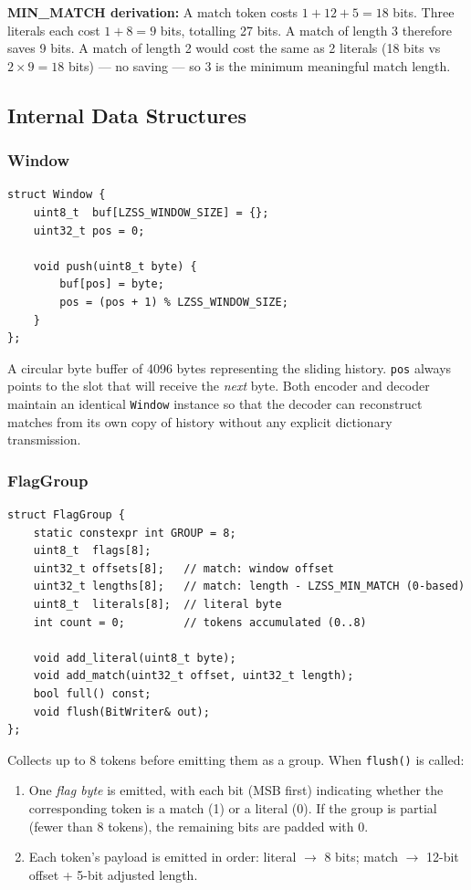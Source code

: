 \textbf{MIN\_MATCH derivation:}
A match token costs $1 + 12 + 5 = 18$ bits.
Three literals each cost $1 + 8 = 9$ bits, totalling 27 bits.
A match of length 3 therefore saves 9 bits.
A match of length 2 would cost the same as 2 literals (18 bits vs $2 \times 9 = 18$ bits)
--- no saving --- so 3 is the minimum meaningful match length.

\subsection{Internal Data Structures}

\subsubsection{Window}

\begin{lstlisting}[style=cpp]
struct Window {
    uint8_t  buf[LZSS_WINDOW_SIZE] = {};
    uint32_t pos = 0;

    void push(uint8_t byte) {
        buf[pos] = byte;
        pos = (pos + 1) % LZSS_WINDOW_SIZE;
    }
};
\end{lstlisting}

A circular byte buffer of 4096 bytes representing the sliding history.
\texttt{pos} always points to the slot that will receive the \emph{next} byte.
Both encoder and decoder maintain an identical \texttt{Window} instance so that
the decoder can reconstruct matches from its own copy of history without any
explicit dictionary transmission.

\subsubsection{FlagGroup}

\begin{lstlisting}[style=cpp]
struct FlagGroup {
    static constexpr int GROUP = 8;
    uint8_t  flags[8];
    uint32_t offsets[8];   // match: window offset
    uint32_t lengths[8];   // match: length - LZSS_MIN_MATCH (0-based)
    uint8_t  literals[8];  // literal byte
    int count = 0;         // tokens accumulated (0..8)

    void add_literal(uint8_t byte);
    void add_match(uint32_t offset, uint32_t length);
    bool full() const;
    void flush(BitWriter& out);
};
\end{lstlisting}

Collects up to 8 tokens before emitting them as a group.
When \texttt{flush()} is called:
\begin{enumerate}
  \item One \emph{flag byte} is emitted, with each bit (MSB first) indicating whether
        the corresponding token is a match (1) or a literal (0).
        If the group is partial (fewer than 8 tokens), the remaining bits are padded with 0.
  \item Each token's payload is emitted in order:
        literal $\to$ 8 bits; match $\to$ 12-bit offset + 5-bit adjusted length.
\end{enumerate}

